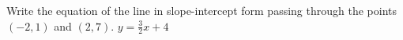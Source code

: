 {Write the equation of the line in slope-intercept form passing through the points $(-2,1)$ and $(2,7)$.}
{$y=\frac{3}{2}x + 4$}
